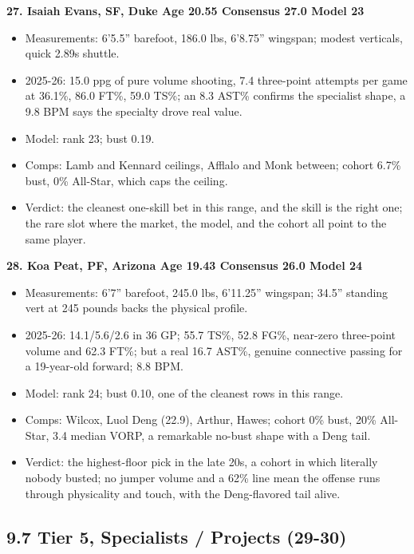 \documentclass[
  10pt,
]{article}
\providecommand{\tightlist}{%
  \setlength{\itemsep}{0pt}\setlength{\parskip}{0pt}}
\begin{document}
\textbf{27. Isaiah Evans, SF, Duke \textbar{} Age 20.55 \textbar{} Consensus
27.0 \textbar{} Model 23}

\begin{itemize}
\tightlist
\item
  Measurements: 6'5.5'' barefoot, 186.0 lbs, 6'8.75'' wingspan; modest
  verticals, quick 2.89s shuttle.
\item
  2025-26: 15.0 ppg of pure volume shooting, 7.4 three-point attempts per game
  at 36.1\%, 86.0 FT\%, 59.0 TS\%; an 8.3 AST\% confirms the specialist shape, a
  9.8 BPM says the specialty drove real value.
\item
  Model: rank 23; bust 0.19.
\item
  Comps: Lamb and Kennard ceilings, Afflalo and Monk between; cohort 6.7\% bust,
  0\% All-Star, which caps the ceiling.
\item
  Verdict: the cleanest one-skill bet in this range, and the skill is the right
  one; the rare slot where the market, the model, and the cohort all point to
  the same player.
\end{itemize}

\textbf{28. Koa Peat, PF, Arizona \textbar{} Age 19.43 \textbar{} Consensus 26.0
\textbar{} Model 24}

\begin{itemize}
\tightlist
\item
  Measurements: 6'7'' barefoot, 245.0 lbs, 6'11.25'' wingspan; 34.5'' standing
  vert at 245 pounds backs the physical profile.
\item
  2025-26: 14.1/5.6/2.6 in 36 GP; 55.7 TS\%, 52.8 FG\%, near-zero three-point
  volume and 62.3 FT\%; but a real 16.7 AST\%, genuine connective passing for a
  19-year-old forward; 8.8 BPM.
\item
  Model: rank 24; bust 0.10, one of the cleanest rows in this range.
\item
  Comps: Wilcox, Luol Deng (22.9), Arthur, Hawes; cohort 0\% bust, 20\%
  All-Star, 3.4 median VORP, a remarkable no-bust shape with a Deng tail.
\item
  Verdict: the highest-floor pick in the late 20s, a cohort in which literally
  nobody busted; no jumper volume and a 62\% line mean the offense runs through
  physicality and touch, with the Deng-flavored tail alive.
\end{itemize}

\subsection{9.7 Tier 5, Specialists / Projects
(29-30)}\label{tier-5-specialists-projects-29-30}
\end{document}
